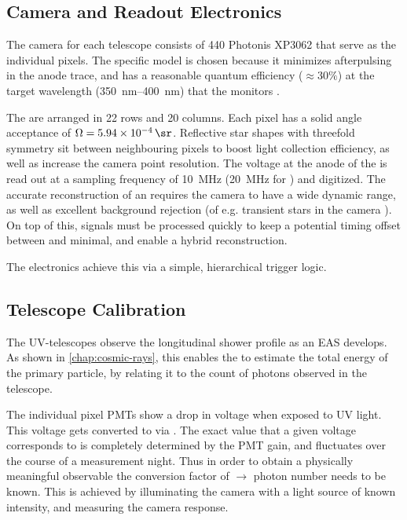 \subsection{Camera and Readout Electronics}

The camera for each telescope consists of 440 Photonis XP3062 \PMTs that serve 
as the individual pixels. The specific model is chosen because it minimizes 
afterpulsing in the anode trace, and has a reasonable quantum efficiency 
($\approx30\%$) at the target wavelength (\SIrange{350}{400}{\nano\meter}) that 
the \FD monitors \cite{xiaoCalibrationPhotonisXP30622005}.

The \PMTs are arranged in 22 rows and 20 columns. Each pixel has a solid angle 
acceptance of $\Omega = \SI{5.94e-4}{\sr}$. Reflective star shapes with 
threefold symmetry sit between neighbouring pixels to boost light collection 
efficiency, as well as increase the camera point resolution. The voltage at the 
anode of the \PMTs is read out at a sampling frequency of \SI{10}{\mega\hertz} 
(\SI{20}{\mega\hertz} for \HE) and digitized. The accurate reconstruction of an 
\EAS requires the camera to have a wide dynamic range, as well as excellent 
background rejection (of e.g. transient stars in the camera \FOV). On top of 
this, signals must be processed quickly to keep a potential timing offset 
between \FD and \SD minimal, and enable a hybrid reconstruction.

The \FD electronics achieve this via a simple, hierarchical trigger logic.

\subsection{Telescope Calibration}
\label{ssec:fd-calibration}

The UV-telescopes observe the longitudinal shower profile as an EAS develops. As 
shown in \autoref{chap:cosmic-rays}, this enables the \FD to estimate the total 
energy of the primary particle, by relating it to the count of photons observed 
in the telescope.

The individual pixel PMTs show a drop  in voltage when exposed to UV light. This
voltage gets converted to \ADC via . The exact \ADC value that a 
given voltage corresponds to is completely determined by the PMT gain, and
fluctuates over the course of a measurement night. Thus in order to obtain a 
physically meaningful observable the conversion factor of \ADC $\rightarrow$ 
photon number needs to be known. This is achieved by illuminating the \FD camera 
with a light source of known intensity, and measuring the camera response. 

